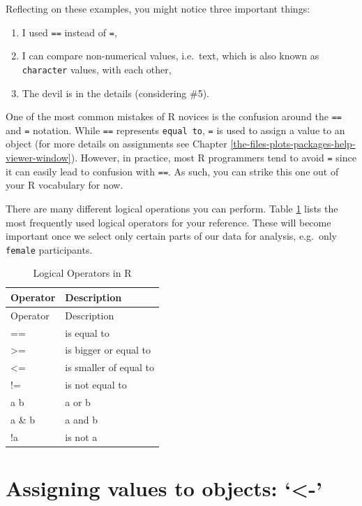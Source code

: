 \documentclass[
]{book}
\providecommand{\tightlist}{%
  \setlength{\itemsep}{0pt}\setlength{\parskip}{0pt}}
\begin{document}
Reflecting on these examples, you might notice three important things:

\begin{enumerate}
\def\labelenumi{\arabic{enumi}.}
\tightlist
\item
  I used \texttt{==} instead of \texttt{=},
\item
  I can compare non-numerical values, i.e.~text, which is also known as \texttt{character} values, with each other,
\item
  The devil is in the details (considering \#5).
\end{enumerate}

One of the most common mistakes of R novices is the confusion around the \texttt{==} and \texttt{=} notation. While \texttt{==} represents \texttt{equal\ to}, \texttt{=} is used to assign a value to an object (for more details on assignments see Chapter \ref{the-files-plots-packages-help-viewer-window}). However, in practice, most R programmers tend to avoid \texttt{=} since it can easily lead to confusion with \texttt{==}. As such, you can strike this one out of your R vocabulary for now.

There are many different logical operations you can perform. Table \ref{tab:logical-operators-r} lists the most frequently used logical operators for your reference. These will become important once we select only certain parts of our data for analysis, e.g.~only \texttt{female} participants.

\begin{longtable}[]{@{}ll@{}}
\caption{\label{tab:logical-operators-r} Logical Operators in R}\tabularnewline
\toprule
Operator & Description \\
\midrule
\endfirsthead
\toprule
Operator & Description \\
\midrule
\endhead
== & is equal to \\
\textgreater= & is bigger or equal to \\
\textless= & is smaller of equal to \\
!= & is not equal to \\
a \textbar{} b & a or b \\
a \& b & a and b \\
!a & is not a \\
\bottomrule
\end{longtable}

\hypertarget{assigning-values-to-objects}{%
\section{Assigning values to objects: `\textless-'}\label{assigning-values-to-objects}}
\end{document}
